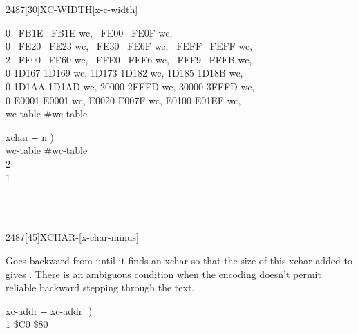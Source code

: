 \begin{worddef}{2487}[30]{XC-WIDTH}[x-c-width]
\begin{implement}
	0 ~FB1E ~FB1E wc, ~FE00 ~FE0F wc,\\
	0 ~FE20 ~FE23 wc, ~FE30 ~FE6F wc, ~FEFF ~FEFF wc,\\
	2 ~FF00 ~FF60 wc, ~FFE0 ~FFE6 wc, ~FFF9 ~FFFB wc,\\
	0 1D167 1D169 wc, 1D173 1D182 wc, 1D185 1D18B wc,\\
	0 1D1AA 1D1AD wc, 20000 2FFFD wc, 30000 3FFFD wc,\\
	0 E0001 E0001 wc, E0020 E007F wc, E0100 E01EF wc,\\
	 wc-table \word{-}  \#wc-table

	 

	\word{:}   xchar -{}- n ) \\
	\tab wc-table \#wc-table  \word{+}   \\
	\tab[2]     
		  2  \word{+}     \\
	    1 \word{;}
	\end{implement}

	\begin{testing} %
		 \\
		 \\
	\end{testing}
\end{worddef}

\vspace*{-2ex}
\begin{worddef}{2487}[45]{XCHAR-}[x-char-minus]%
\item {}

	Goes backward from  until it finds an xchar so that the
	size of this xchar added to  gives .
	There is an ambiguous condition when the encoding doesn't permit reliable
	backward stepping through the text.

	\begin{implement} %
	\word{:}   xc-addr -{}- xc-addr' ) \\
	\tab {}  1  \word{-}   \$C0  \$80   \word{;}
	\end{implement}
\end{worddef}


